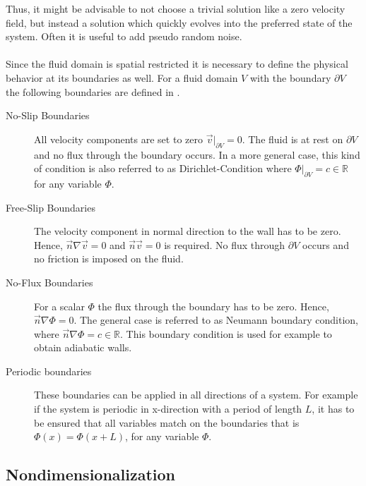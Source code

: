 Thus, it might be advisable to not choose a trivial solution like a zero velocity field, but instead a solution which quickly evolves into the preferred state
of the system. Often it is useful to add pseudo random noise.\\
\\
Since the fluid domain is spatial restricted it is necessary to define the physical behavior at its boundaries as well.
For a fluid domain $V$ with the boundary $\partial V$ the following boundaries are defined in \citep{Griebel1998, ferziger99}.

\begin{description}
    \item[No-Slip Boundaries] All velocity components are set to zero $\vec{v}|_{\partial V} = 0$. The fluid is at rest on $\partial V$ and no flux through
                              the boundary occurs.
                              In a more general case, this kind of condition is  also referred to as Dirichlet-Condition where $\Phi|_{\partial V} = c\in\mathbb{R}$
                              for any variable $\Phi$.

    \item[Free-Slip Boundaries] The velocity component in normal direction to the wall has to be zero. Hence, $\vec{n} \nabla \vec{v} = 0$ and $\vec{n}\vec{v}=0$ is required.
                                No flux through $\partial V$ occurs and no friction is imposed on the fluid.

    \item[No-Flux Boundaries] For a scalar $\Phi$ the flux through the boundary has to be zero. Hence, $\vec{n}\nabla \Phi = 0$.
                              The general case is referred to as Neumann boundary condition, where $\vec{n}\nabla \Phi = c\in \mathbb{R}$.
                              This boundary condition is used for example to obtain adiabatic walls.

    \item[Periodic boundaries] These boundaries can be applied in all directions of a system. For example if the system is periodic in x-direction with a period of length $L$,
                               it has to be ensured that all variables match on the boundaries that is $\Phi(x) = \Phi(x + L)$, for any variable $\Phi$.
\end{description}

\clearpage

\subsection{Nondimensionalization}

